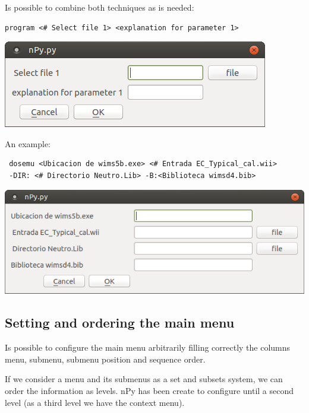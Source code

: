 \documentclass[a4paper,10pt]{article}
\begin{document}
\noindent Is possible to combine both techniques as is needed:

\begin{verbatim}
program <# Select file 1> <explanation for parameter 1>
 \end{verbatim}

 \begin{center}
 \includegraphics[width=\textwidth]{img/contextMenuExampleCombined.png}
\end{center}

\noindent An example:

\begin{verbatim}
 dosemu <Ubicacion de wims5b.exe> <# Entrada EC_Typical_cal.wii> 
 -DIR: <# Directorio Neutro.Lib> -B:<Biblioteca wimsd4.bib>
 \end{verbatim}

\begin{center}
 \includegraphics[width=\textwidth]{img/contextMenuCombined.png}
\end{center}


\subsection{Setting and ordering the main menu}

Is possible to configure the main menu arbitrarily filling correctly the columns menu, submenu, submenu position and sequence order.

If we consider a menu and its submenus as a set and subsets system, we can order the information as levels. nPy has been create to configure until a second level (as a third level we have the context menu).
\end{document}
